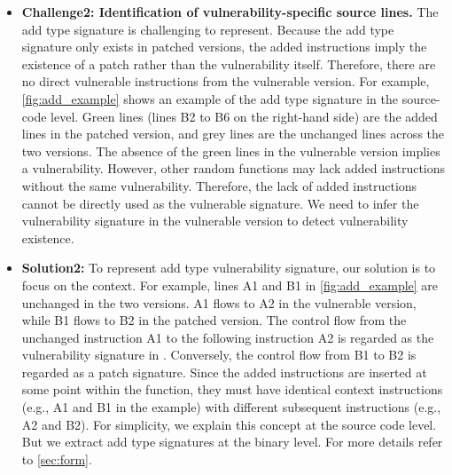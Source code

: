 \begin{itemize}
\item \textbf{Challenge2: Identification of vulnerability-specific source lines.} 
  The add type signature is challenging to represent. 
  Because the add type signature only exists in patched versions, the added instructions imply the existence of a patch rather than the vulnerability itself. 
  Therefore, there are no direct vulnerable instructions from the vulnerable version. 
  For example, \autoref{fig:add_example} shows an example of the add type signature in the source-code level. 
  Green lines (lines B2 to B6 on the right-hand side) are the added lines in the patched version, and grey lines are the unchanged lines across the two versions. 
  The absence of the green lines in the vulnerable version implies a vulnerability.
  However, other random functions may lack added instructions without the same vulnerability. 
  Therefore, the lack of added instructions cannot be directly used as the vulnerable signature. 
  We need to infer the vulnerability signature in the vulnerable version to detect vulnerability existence.
 
\item \textbf{Solution2:} 
To represent add type vulnerability signature, our solution is to focus on the context. 
For example, lines A1 and B1 in \autoref{fig:add_example} are unchanged in the two versions. 
A1 flows to A2 in the vulnerable version,  while B1 flows to B2 in the patched version. 
The control flow from the unchanged instruction A1 to the following instruction A2 is regarded as the vulnerability signature in \name. 
Conversely, the control flow from B1 to B2 is regarded as a patch signature. 
Since the added instructions are inserted at some point within the function, they must have identical context instructions (e.g., A1 and B1 in the example) with different subsequent instructions (e.g., A2 and B2). For simplicity, we explain this concept at the source code level. But we extract add type signatures at the binary level. For more details refer to \autoref{sec:form}.
\end{itemize}


